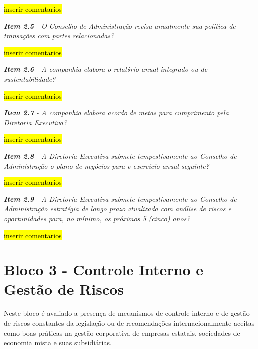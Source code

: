 \hl{inserir comentarios}

\begin{framed}
\noindent\textit{\textbf{Item 2.5} - O Conselho de Administração revisa anualmente sua política de transações com partes relacionadas?}
\end{framed}

\hl{inserir comentarios}

\begin{framed}
\noindent\textit{\textbf{Item 2.6} - A companhia elabora o relatório anual integrado ou de sustentabilidade?}
\end{framed}

\hl{inserir comentarios}

\begin{framed}
\noindent\textit{\textbf{Item 2.7} - A companhia elabora acordo de metas para cumprimento pela Diretoria Executiva?}
\end{framed}

\hl{inserir comentarios}

\begin{framed}
\noindent\textit{\textbf{Item 2.8} - A Diretoria Executiva submete tempestivamente ao Conselho de Administração o plano de negócios para o exercício anual seguinte?}
\end{framed}

\hl{inserir comentarios}

\begin{framed}
\noindent\textit{\textbf{Item 2.9} - A Diretoria Executiva submete tempestivamente ao Conselho de Administração estratégia de longo prazo atualizada com análise de riscos e oportunidades para, no mínimo, os próximos 5 (cinco) anos?}
\end{framed}

\hl{inserir comentarios}

\section{Bloco 3 - Controle Interno e Gestão de Riscos}
Neste bloco é avaliado a presença de mecanismos de controle interno e de gestão de riscos constantes da legislação ou de recomendações internacionalmente aceitas como boas práticas na gestão corporativa de empresas estatais, sociedades de economia mista e suas subsidiárias.

